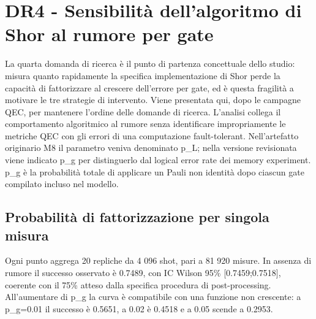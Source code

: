 \section{DR4 - Sensibilità dell'algoritmo di Shor al rumore per gate}\label{sec:finale_5_4}

La quarta domanda di ricerca è il punto di partenza concettuale dello studio: misura quanto rapidamente la specifica implementazione di Shor perde la capacità di fattorizzare al crescere dell'errore per gate, ed è questa fragilità a motivare le tre strategie di intervento. Viene presentata qui, dopo le campagne QEC, per mantenere l'ordine delle domande di ricerca. L'analisi collega il comportamento algoritmico al rumore senza identificare impropriamente le metriche QEC con gli errori di una computazione fault-tolerant. Nell'artefatto originario M8 il parametro veniva denominato p\_L; nella versione revisionata viene indicato p\_g per distinguerlo dal logical error rate dei memory experiment. p\_g è la probabilità totale di applicare un Pauli non identità dopo ciascun gate compilato incluso nel modello.

\subsection{Probabilità di fattorizzazione per singola misura}\label{sec:finale_5_4_1}\label{sec:risultati_logico}

Ogni punto aggrega 20 repliche da 4 096 shot, pari a 81 920 misure. In assenza di rumore il successo osservato è 0.7489, con IC Wilson 95\% {[}0.7459;0.7518{]}, coerente con il 75\% atteso dalla specifica procedura di post-processing. All'aumentare di p\_g la curva è compatibile con una funzione non crescente: a p\_g=0.01 il successo è 0.5651, a 0.02 è 0.4518 e a 0.05 scende a 0.2953.

